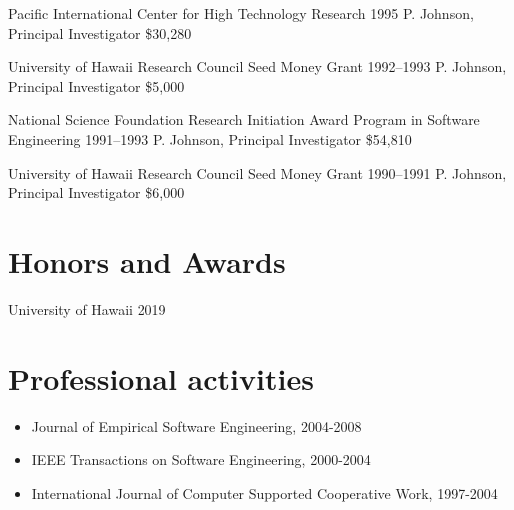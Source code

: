 \documentclass[11pt,letterpaper,sans]{moderncv} %
\begin{document}
        {Pacific International Center for High Technology Research} %
        {1995} %
        {P. Johnson, Principal Investigator}  %
        {\$30,280} %

        {University of Hawaii Research Council Seed Money Grant} %
        {1992--1993} %
        {P. Johnson, Principal Investigator}  %
        {\$5,000} %

        {National Science Foundation Research Initiation Award Program in Software Engineering} %
        {1991--1993} %
        {P. Johnson, Principal Investigator}  %
        {\$54,810} %

        {University of Hawaii Research Council Seed Money Grant} %
        {1990--1991} %
        {P. Johnson, Principal Investigator}  %
        {\$6,000} %

\section{Honors and Awards}

             {University of Hawaii}
             {2019} {} {}


\section{Professional activities}

\begin{itemize}
\item Journal of Empirical Software Engineering, 2004-2008
\item IEEE Transactions on Software Engineering, 2000-2004
\item International Journal of Computer Supported Cooperative Work, 1997-2004
\end{itemize}
\end{document}
